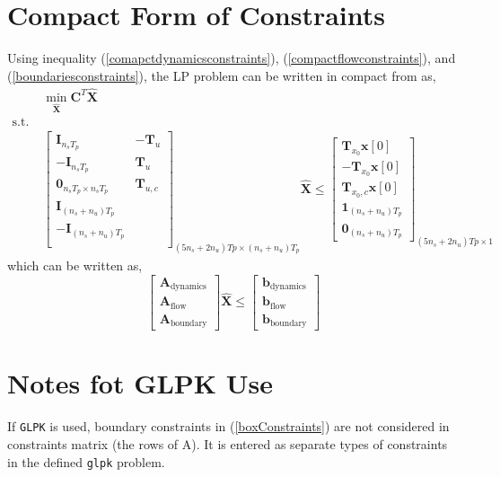 \documentclass{article}
\begin{document}
\section{Compact Form of Constraints}
Using inequality (\ref{comapctdynamicsconstraints}), (\ref{compactflowconstraints}), and (\ref{boundariesconstraints}), the LP problem can be written in compact from as,
\begin{equation}
\begin{aligned}
&\min_{\hat{\mathbf{X}}} \mathbf{C}^T \hat{\mathbf{X}} \\
\text{s.t.} \;  \\
&
\begin{bmatrix}
\mathbf{I}_{n_s T_p} & -\mathbf{T}_u\\
-\mathbf{I}_{n_s T_p} & \mathbf{T}_u\\
\mathbf{0}_{n_s T_p \times n_s T_p} & \mathbf{T}_{u,c} \\
\mathbf{I}_{(n_s+n_u)T_p}\\
-\mathbf{I}_{(n_s+n_u)T_p}\\
\end{bmatrix}_{(5n_s+2n_u)Tp \times (n_s+n_u)T_p} \hat{\mathbf{X}}
\leq
\begin{bmatrix}
\mathbf{T}_{x_0}\mathbf{x}[0]\\
-\mathbf{T}_{x_0}\mathbf{x}[0]\\
\mathbf{T}_{x_0,c} \mathbf{x}[0]\\
\mathbf{1}_{(n_s+n_u)T_p}\\
\mathbf{0}_{(n_s+n_u)T_p}
\end{bmatrix}_{(5n_s+2n_u)Tp \times 1}
\end{aligned}
\end{equation}
which can be written as,
\begin{equation}
\begin{bmatrix}
\mathbf{A}_{\text{dynamics}}\\
\mathbf{A}_{\text{flow}}\\
\mathbf{A}_{\text{boundary}}
\end{bmatrix}
\hat{\mathbf{X}}
\leq 
\begin{bmatrix}
\mathbf{b}_{\text{dynamics}}\\
\mathbf{b}_{\text{flow}}\\
\mathbf{b}_{\text{boundary}}
\end{bmatrix}
\end{equation}

\section{Notes fot GLPK Use}
If \texttt{GLPK} is used, boundary constraints in (\ref{boxConstraints}) are not considered in constraints matrix (the rows of A). It is entered as separate types of constraints in the defined \texttt{glpk} problem.
\end{document}
